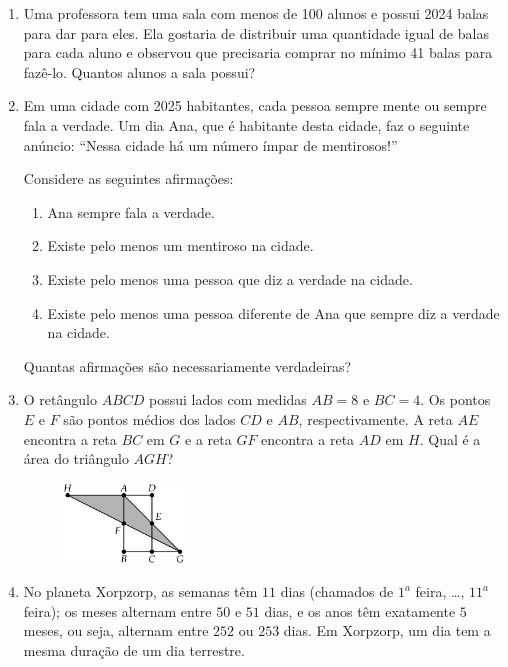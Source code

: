 \documentclass[12pt]{article}
\begin{document}
\begin{enumerate}[label=\textbf{\arabic*.}]
        \item Uma professora tem uma sala com menos de 100 alunos e possui 2024 balas para dar para eles. Ela gostaria
de distribuir uma quantidade igual de balas para cada aluno e observou que precisaria comprar no mínimo 41
balas para fazê-lo. Quantos alunos a sala possui?
        \item Em uma cidade com 2025 habitantes, cada pessoa sempre mente ou sempre fala a verdade. Um dia Ana,
          que é habitante desta cidade, faz o seguinte anúncio: “Nessa cidade há um número ímpar de mentirosos!”

          Considere as seguintes afirmações:
          \begin{enumerate}[label={\roman*.}]
            \item Ana sempre fala a verdade.
            \item Existe pelo menos um mentiroso na cidade.
            \item Existe pelo menos uma pessoa que diz a verdade na cidade.
            \item Existe pelo menos uma pessoa diferente de Ana que sempre diz a verdade na cidade.
          \end{enumerate}
          Quantas afirmações são necessariamente verdadeiras?
        \item O retângulo $ABCD$ possui lados com medidas $AB = 8$ e $BC = 4$. Os pontos $E$ e $F$ são pontos médios dos
lados $CD$ e $AB$, respectivamente. A reta $AE$ encontra a reta $BC$ em $G$ e a reta $GF$ encontra a reta $AD$ em $H$. Qual
é a área do triângulo $AGH$?
          \begin{figure}[h]
            \centering
            \includegraphics[width=0.3\textwidth]{third.png}
          \end{figure}
        \item No planeta Xorpzorp, as semanas têm $11$ dias (chamados de $1^a$ feira, \dots, $11^a$ feira); os meses alternam entre
$50$ e $51$ dias, e os anos têm exatamente $5$ meses, ou seja, alternam entre $252$ ou $253$ dias. Em Xorpzorp, um dia
tem a mesma duração de um dia terrestre.


\end{enumerate}
\end{document}
